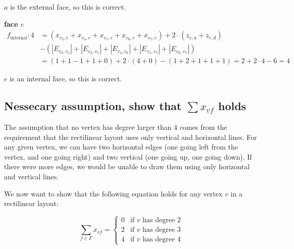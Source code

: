 $a$ is the external face, so this is correct.

\textbf{face $e$}
\begin{align*}
  f_{\text{internal}}: 4
  &= (x_{v_3,e}+x_{v_4,e}+x_{v_5,e}+x_{v_6,e}+x_{v_7,e})
   + 2 \cdot (z_{e,a} + z_{e,d})\\
  &- (|E_{v_3,v_4}| + |E_{v_3,v_5}| + |E_{v_4,v_6}| + |E_{v_5,v_7}| + |E_{v_6,v_7}|) \\
  &= (1+1-1+1+0) + 2 \cdot (4+0) - (1+2+1+1+1)  = 2 + 2 \cdot 4 - 6 = 4
\end{align*}

$e$ is an internal face, so this is correct.



\subsection{Nessecary assumption, show that $\sum x_{vf}$ holds}

The assumption that no vertex has degree larger than 4 comes from the requirement that the rectilinear layout uses only vertical and horizontal lines. For any given vertex, we can have two horizontal edges (one going left from the vertex, and one going right) and two vertical (one going up, one going down). If there were more edges, we would be unable to draw them using only horizontal and vertical lines.

We now want to show that the following equation holds for any vertex $v$ in a rectilinear layout:

$$
  \sum_{f \in F}{x_{vf}} =
  \begin{cases}
    0 & \text{if $v$ has degree 2} \\
    2 & \text{if $v$ has degree 3} \\
    4 & \text{if $v$ has degree 4}
  \end{cases}
$$

